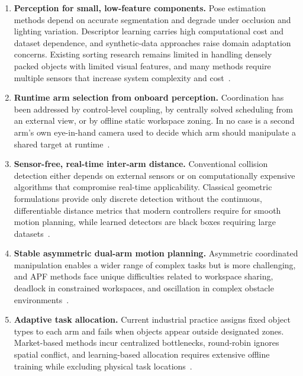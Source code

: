 \begin{enumerate}
    \item \textbf{Perception for small, low-feature components.} Pose estimation methods depend on
    accurate segmentation and degrade under occlusion and lighting variation. Descriptor learning
    carries high computational cost and dataset dependence, and synthetic-data approaches raise
    domain adaptation concerns. Existing sorting research remains limited in handling densely packed
    objects with limited visual features, and many methods require multiple sensors that increase
    system complexity and cost~\citep{sk2024bolthandling,sk2024boltsorting}.

    \item \textbf{Runtime arm selection from onboard perception.} Coordination has been addressed by
    control-level coupling, by centrally solved scheduling from an external view, or by offline
    static workspace zoning. In no case is a second arm's own eye-in-hand camera used to decide
    which arm should manipulate a shared target at runtime~\citep{sk2025sharedvision}.

    \item \textbf{Sensor-free, real-time inter-arm distance.} Conventional collision detection either
    depends on external sensors or on computationally expensive algorithms that compromise real-time
    applicability. Classical geometric formulations provide only discrete detection without the
    continuous, differentiable distance metrics that modern controllers require for smooth motion
    planning, while learned detectors are black boxes requiring large
    datasets~\citep{sk2025distance,surya2025iapf}.

    \item \textbf{Stable asymmetric dual-arm motion planning.} Asymmetric coordinated manipulation
    enables a wider range of complex tasks but is more challenging, and APF methods face unique
    difficulties related to workspace sharing, deadlock in constrained workspaces, and oscillation
    in complex obstacle environments~\citep{surya2025iapf,sk2025competitive}.

    \item \textbf{Adaptive task allocation.} Current industrial practice assigns fixed object types
    to each arm and fails when objects appear outside designated zones. Market-based methods incur
    centralized bottlenecks, round-robin ignores spatial conflict, and learning-based allocation
    requires extensive offline training while excluding physical task
    locations~\citep{sk2025competitive}.


\end{enumerate}
